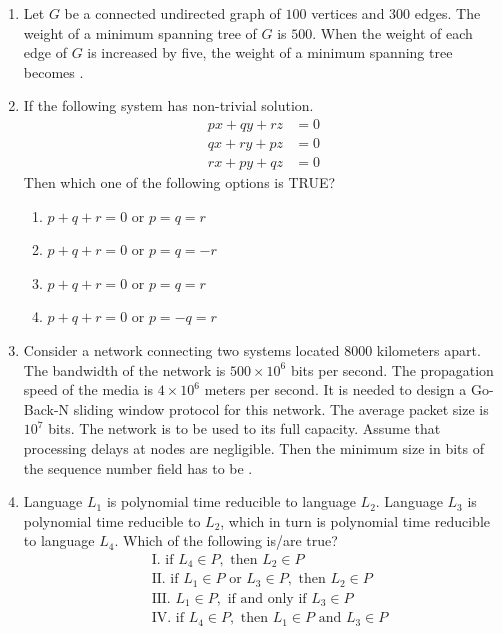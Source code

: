 \documentclass[journal,12pt,onecolumn]{IEEEtran}
\theoremstyle{remark}
\begin{document}
\begin{enumerate}
		\item Let $G$ be a connected undirected graph of $100$ vertices and $300$ edges. The weight of a minimum spanning tree of $G$ is $500$. When the weight of each edge of $G$ is increased by five, the weight of a minimum spanning tree becomes \underline{\hspace{2cm}}.
		
		\hfill{}
		
		\item If the following system has non-trivial solution.
		\begin{align*}
			px + qy + rz &= 0\\
			qx + ry + pz &= 0\\
			rx + py + qz &= 0
		\end{align*}
		Then which one of the following options is TRUE?
		
		\hfill{}
		
		\begin{enumerate}
			\item $p + q + r = 0$ or $p = q = r$
			\item $p + q + r = 0$ or $p = q = -r$
			\item $p + q + r = 0$ or $p = q = r$
			\item $p + q + r = 0$ or $p = -q = r$
		\end{enumerate}
		
		\item Consider a network connecting two systems located $8000$ kilometers apart. The bandwidth of the network is $500 \times 10^6$ bits per second. The propagation speed of the media is $4 \times 10^6$ meters per second. It is needed to design a Go-Back-N sliding window protocol for this network. The average packet size is $10^7$ bits. The network is to be used to its full capacity. Assume that processing delays at nodes are negligible. Then the minimum size in bits of the sequence number field has to be \underline{\hspace{2cm}}.
		
		\hfill{}
		
		\item Language $L_1$ is polynomial time reducible to language $L_2$. Language $L_3$ is polynomial time reducible to $L_2$, which in turn is polynomial time reducible to language $L_4$. Which of the following is/are true?
		\begin{align*}
			&\text{I. if } L_4 \in P, \text{ then } L_2 \in P\\
			&\text{II. if } L_1 \in P \text{ or } L_3 \in P, \text{ then } L_2 \in P\\
			&\text{III. } L_1 \in P, \text{ if and only if } L_3 \in P\\
			&\text{IV. if } L_4 \in P, \text{ then } L_1 \in P \text{ and } L_3 \in P
		\end{align*}
		

\end{enumerate}
\end{document}
